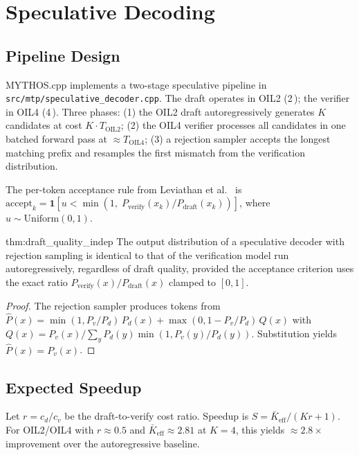 \section{Speculative Decoding}
\label{sec:draft_verify}

\subsection{Pipeline Design}

MYTHOS.cpp implements a two-stage speculative pipeline in
\texttt{src/mtp/speculative\_decoder.cpp}. The draft operates in OIL2
(2\,\BPW); the verifier in OIL4 (4\,\BPW). Three phases:
(1) the OIL2 draft autoregressively generates $K$ candidates at cost
$K \cdot T_{\text{OIL2}}$; (2) the OIL4 verifier processes all
candidates in one batched forward pass at $\approx T_{\text{OIL4}}$;
(3) a rejection sampler accepts the longest matching prefix and
resamples the first mismatch from the verification distribution.

The per-token acceptance rule from
Leviathan et al.~\cite{leviathan2023} is
$\text{accept}_k = \mathbf{1}[u < \min(1,\;
P_{\text{verify}}(x_k) / P_{\text{draft}}(x_k))]$,
where $u \sim \text{Uniform}(0,1)$.

\begin{mythm}{thm:draft_quality_indep}
The output distribution of a speculative decoder with rejection
sampling is identical to that of the verification model run
autoregressively, regardless of draft quality, provided the acceptance
criterion uses the exact ratio $P_{\text{verify}}(x)/P_{\text{draft}}(x)$
clamped to $[0,1]$.
\end{mythm}

\begin{proof}
The rejection sampler produces tokens from
$\hat{P}(x) = \min(1,P_v/P_d)\,P_d(x) + \max(0,1-P_v/P_d)\,Q(x)$
with $Q(x) = P_v(x)/\sum_y P_d(y)\min(1,P_v(y)/P_d(y))$.
Substitution yields $\hat{P}(x) = P_v(x)$.
\end{proof}

\subsection{Expected Speedup}

Let $r = c_d/c_v$ be the draft-to-verify cost ratio. Speedup is
$S = \bar{K}_{\text{eff}} / (K r + 1)$.
For OIL2/OIL4 with $r \approx 0.5$ and $\bar{K}_{\text{eff}} \approx
2.81$ at $K=4$, this yields $\approx 2.8\times$ improvement over the
autoregressive baseline.

